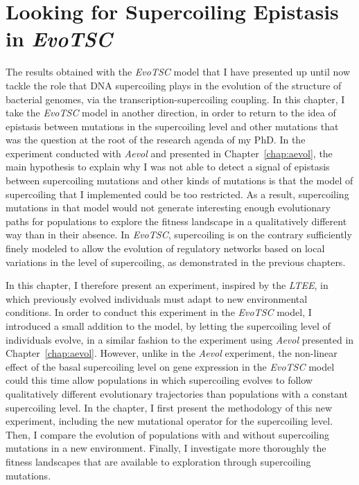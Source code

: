 \chapter{Looking for Supercoiling Epistasis in \emph{EvoTSC}}
\label{chap:epistasis}

The results obtained with the \emph{EvoTSC} model that I have presented up until now tackle the role that DNA supercoiling plays in the evolution of the structure of bacterial genomes, via the transcription-supercoiling coupling.
In this chapter, I take the \emph{EvoTSC} model in another direction, in order to return to the idea of epistasis between mutations in the supercoiling level and other mutations that was the question at the root of the research agenda of my PhD.
In the experiment conducted with \emph{Aevol} and presented in Chapter~\ref{chap:aevol}, the main hypothesis to explain why I was not able to detect a signal of epistasis between supercoiling mutations and other kinds of mutations is that the model of supercoiling that I implemented could be too restricted.
As a result, supercoiling mutations in that model would not generate interesting enough evolutionary paths for populations to explore the fitness landscape in a qualitatively different way than in their absence.
In \emph{EvoTSC}, supercoiling is on the contrary sufficiently finely modeled to allow the evolution of regulatory networks based on local variations in the level of supercoiling, as demonstrated in the previous chapters.

In this chapter, I therefore present an experiment, inspired by the \emph{LTEE}, in which previously evolved individuals must adapt to new environmental conditions.
In order to conduct this experiment in the \emph{EvoTSC} model, I introduced a small addition to the model, by letting the supercoiling level of individuals evolve, in a similar fashion to the experiment using \emph{Aevol} presented in Chapter~\ref{chap:aevol}.
However, unlike in the \emph{Aevol} experiment, the non-linear effect of the basal supercoiling level on gene expression in the \emph{EvoTSC} model could this time allow populations in which supercoiling evolves to follow qualitatively different evolutionary trajectories than populations with a constant supercoiling level.
In the chapter, I first present the methodology of this new experiment, including the new mutational operator for the supercoiling level.
Then, I compare the evolution of populations with and without supercoiling mutations in a new environment.
Finally, I investigate more thoroughly the fitness landscapes that are available to exploration through supercoiling mutations.


